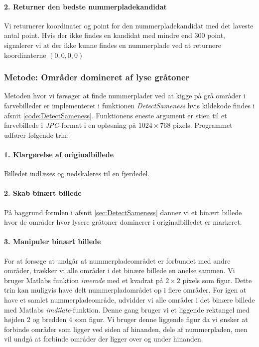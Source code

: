 \paragraph{2. Returner den bedste nummerpladekandidat}
Vi returnerer koordinater og point for den nummerpladekandidat med det laveste antal point. Hvis der ikke findes en kandidat med mindre end 300 point, signalerer vi at der ikke kunne findes en nummerplade ved at returnere koordinaterne $(0,0,0,0)$ 


\subsubsection{Metode: Områder domineret af lyse gråtoner}
Metoden hvor vi førsøger at finde nummerplader ved at kigge på grå områder i farvebilleder er implementeret i funktionen \textit{DetectSameness} hvis kildekode findes i afsnit \vref{code:DetectSameness}. Funktionens eneste argument er stien til et farvebillede i \textit{JPG}-format i en opløsning på $1024 \times 768$ pixels. Programmet udfører følgende trin:

\paragraph{1. Klargørelse af originalbillede}
Billedet indlæses og nedskaleres til en fjerdedel. 

\paragraph{2. Skab binært billede}
På baggrund formlen i afsnit \ref{sec:DetectSameness} danner vi et binært billede hvor de områder hvor lysere gråtoner dominerer i originalbilledet er markeret.

\paragraph{3. Manipuler binært billede}
For at forsøge at undgår at nummerpladeområdet er forbundet med andre områder, trækker vi alle områder i det binære billede en anelse sammen. Vi bruger Matlabs funktion \textit{imerode} med et kvadrat på $2 \times 2$ pixels som figur. Dette trin kan muligvis have delt nummerpladområdet op i flere områder. For igen at have et samlet nummerpladeområde, udvidder vi alle områder i det binære billede med Matlabs \textit{imdilate}-funktion. Denne gang bruger vi et liggende rektangel med højden 2 og bredden 4 som figur. Vi bruger denne liggende figur da vi ønsker at forbinde områder som ligger ved siden af hinanden, dele af nummerpladen, men vil undgå at forbinde områder der ligger over og under hinanden. 

